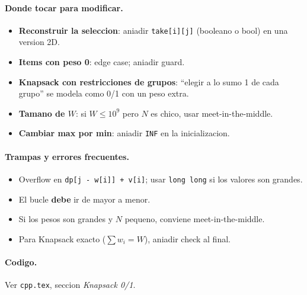\paragraph{Donde tocar para modificar.}
\begin{itemize}\setlength\itemsep{0pt}
	\item \textbf{Reconstruir la seleccion}: aniadir \texttt{take[i][j]} (booleano o bool) en una version 2D.
	\item \textbf{Items con peso 0}: edge case; aniadir guard.
	\item \textbf{Knapsack con restricciones de grupos}: ``elegir a lo sumo 1 de cada grupo'' se modela como 0/1 con un peso extra.
	\item \textbf{Tamano de $W$}: si $W \le 10^9$ pero $N$ es chico, usar meet-in-the-middle.
	\item \textbf{Cambiar max por min}: aniadir \texttt{INF} en la inicializacion.
\end{itemize}

\paragraph{Trampas y errores frecuentes.}
\begin{itemize}\setlength\itemsep{0pt}
	\item Overflow en \texttt{dp[j - w[i]] + v[i]}; usar \texttt{long long} si los valores son grandes.
	\item El bucle \textbf{debe} ir de mayor a menor.
	\item Si los pesos son grandes y $N$ pequeno, conviene meet-in-the-middle.
	\item Para Knapsack exacto ($\sum w_i = W$), aniadir check al final.
\end{itemize}

\paragraph{Codigo.}
Ver \texttt{cpp.tex}, seccion \textit{Knapsack 0/1}.

\vspace{0.5em}

